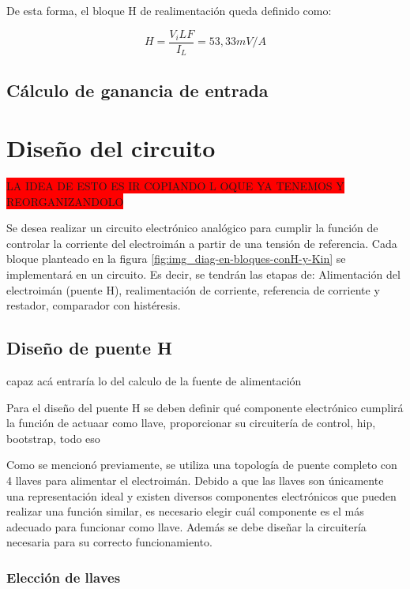 De esta forma, el bloque H de realimentación queda definido como:

\begin{equation}
	H=\frac{V_iLF}{I_L}=53,33 mV/A
\end{equation}



\subsection{Cálculo de ganancia de entrada}






\section{Diseño del circuito}

\colorbox{red}{LA IDEA DE ESTO ES IR COPIANDO L OQUE YA TENEMOS Y REORGANIZANDOLO}

Se desea realizar un circuito electrónico analógico para cumplir la función de controlar la corriente del electroimán a partir de una tensión de referencia. Cada bloque planteado en la figura \ref{fig:img_diag-en-bloques-conH-y-Kin} se implementará en un circuito. Es decir, se tendrán las etapas de: Alimentación del electroimán (puente H), realimentación de corriente, referencia de corriente y restador, comparador con histéresis.

\subsection{Diseño de puente H}

capaz acá entraría lo del calculo de la fuente de alimentación

Para el diseño del puente H se deben definir qué componente electrónico cumplirá la función de actuaar como llave, proporcionar su circuitería de control, hip, bootstrap, todo eso


Como se mencionó previamente, se utiliza una topología de puente completo con 4 llaves para alimentar el electroimán. Debido a que las llaves son únicamente una representación ideal y existen diversos componentes electrónicos que pueden realizar una función similar, es necesario elegir cuál componente es el más adecuado para funcionar como llave. Además se debe diseñar la circuitería necesaria para su correcto funcionamiento.

\subsubsection{Elección de llaves}

